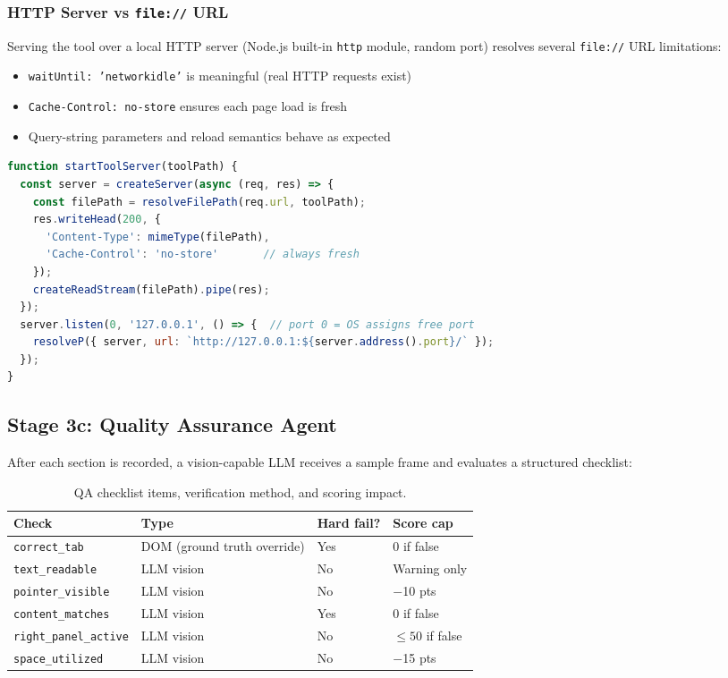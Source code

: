 \documentclass[12pt,a4paper]{article}
\begin{document}
\subsubsection{HTTP Server vs \texttt{file://} URL}

Serving the tool over a local HTTP server (Node.js built-in \texttt{http} module,
random port) resolves several \texttt{file://} URL limitations:

\begin{itemize}[leftmargin=2em]
  \item \texttt{waitUntil: 'networkidle'} is meaningful (real HTTP requests exist)
  \item \texttt{Cache-Control: no-store} ensures each page load is fresh
  \item Query-string parameters and reload semantics behave as expected
\end{itemize}

\begin{lstlisting}[language=JavaScript, caption=Embedded HTTP server]
function startToolServer(toolPath) {
  const server = createServer(async (req, res) => {
    const filePath = resolveFilePath(req.url, toolPath);
    res.writeHead(200, {
      'Content-Type': mimeType(filePath),
      'Cache-Control': 'no-store'       // always fresh
    });
    createReadStream(filePath).pipe(res);
  });
  server.listen(0, '127.0.0.1', () => {  // port 0 = OS assigns free port
    resolveP({ server, url: `http://127.0.0.1:${server.address().port}/` });
  });
}
\end{lstlisting}

\subsection{Stage 3c: Quality Assurance Agent}
\label{sec:qa}

After each section is recorded, a vision-capable LLM receives a sample frame and
evaluates a structured checklist:

\begin{table}[h]
\centering\small
\begin{tabular}{@{}llll@{}}
\toprule
\textbf{Check} & \textbf{Type} & \textbf{Hard fail?} & \textbf{Score cap} \\
\midrule
\texttt{correct\_tab}      & DOM (ground truth override) & Yes & 0 if false \\
\texttt{text\_readable}    & LLM vision                  & No  & Warning only \\
\texttt{pointer\_visible}  & LLM vision                  & No  & $-$10 pts \\
\texttt{content\_matches}  & LLM vision                  & Yes & 0 if false \\
\texttt{right\_panel\_active} & LLM vision               & No  & $\leq 50$ if false \\
\texttt{space\_utilized}   & LLM vision                  & No  & $-$15 pts \\
\bottomrule
\end{tabular}
\caption{QA checklist items, verification method, and scoring impact.}
\end{table}
\end{document}
